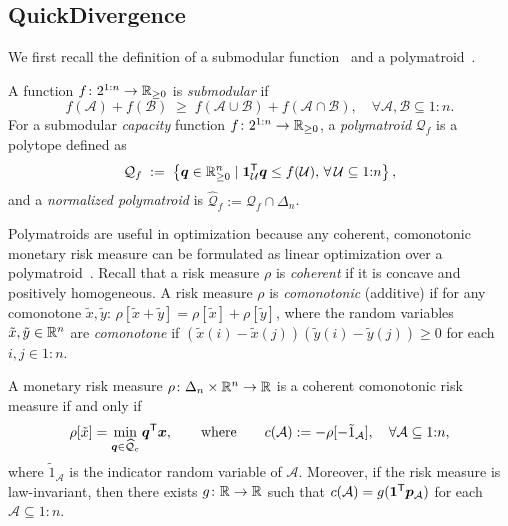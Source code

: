 \subsection{QuickDivergence} \label{sec:quickdivergence}
We first recall the definition of a submodular function~\cite[section~2.1]{Korte2012} and a polymatroid~\cite[definition~14.9]{Korte2012}.
\begin{definition} \label{def:polymatroid}
A function $f \colon 2^{1{:}n} \to \mathbb{R}_{\ge 0}$ is \emph{submodular} if
\[ 
  f(\mathcal{A}) + f(\mathcal{B})
  \; \geq\;
  f(\mathcal{A} \cup \mathcal{B}) + f(\mathcal{A} \cap \mathcal{B}),
  \quad
  \forall \mathcal{A}, \mathcal{B} \subseteq 1{:}n.
\]
For a submodular \emph{capacity} function $f \colon 2^{1{:}n} \to \mathbb{R}_{\ge 0}$, a \emph{polymatroid} $\mathcal{Q}_f$ is a polytope defined as
  \[
    \mathcal{Q}_f
    \;:=\;
    \left\{ \bm{q} \in \mathbb{R}_{\ge 0}^n  \mid   \bm{1}^{\mathsf{T}}_{\mathcal{U}} \bm{q} \leq f(\mathcal{U}), \, \forall \,  \mathcal{U} \subseteq 1{:}n \right\},
\]
and a \emph{normalized polymatroid} is $\widehat{\mathcal{Q}}_f := \mathcal{Q}_f \cap \Delta_n $.
\end{definition}


Polymatroids are useful in optimization because any coherent, comonotonic monetary risk measure can be formulated as linear optimization over a polymatroid~\cite[theorems~4.88 and~4.94]{Follmer2016}. Recall that a risk measure $\rho$ is \emph{coherent} if it is concave and positively homogeneous.  A risk measure $\rho$ is \emph{comonotonic} (additive) if for any comonotone $\tilde{x}, \tilde{y}$: $\rho[ \tilde{x} + \tilde{y} ] = \rho[ \tilde{x} ] + \rho[ \tilde{y} ]$, where the random variables $\tilde{x}, \tilde{y} \in \mathbb{R}^n$ are \emph{comonotone} if $(\tilde{x}(i) - \tilde{x}(j))(\tilde{y}(i) - \tilde{y}(j)) \ge 0$ for each $i,j\in 1{:}n$.

\begin{proposition} \label{prop:coherent-polymatroid}
A monetary risk measure $\rho\colon \Delta_n \times  \mathbb{R}^n \to \mathbb{R}$ is a coherent comonotonic risk measure if and only if
\begin{equation}\label{eq:comonotonic-optimization}
  \rho[\tilde{x}] = \min_{\bm{q}\in \widehat{\mathcal{Q}}_c} \bm{q}^{\mathsf{T}}  \bm{x},
  \qquad
  \text{where}
  \qquad
  c(\mathcal{A}) := -\rho[ -\tilde{1}_{\mathcal{A}} ], \quad \forall  \mathcal{A} \subseteq 1{:}n,
\end{equation}
where $\tilde{1}_{\mathcal{A}}$ is the indicator random variable of $\mathcal{A}$. Moreover, if the risk measure is law-invariant, then there exists $g\colon \mathbb{R} \to \mathbb{R}$ such that $c(\mathcal{A}) = g(\bm{1}^{\mathsf{T}} \bm{p}_{\mathcal{A}})$ for each $\mathcal{A} \subseteq 1{:}n$.
\end{proposition}

